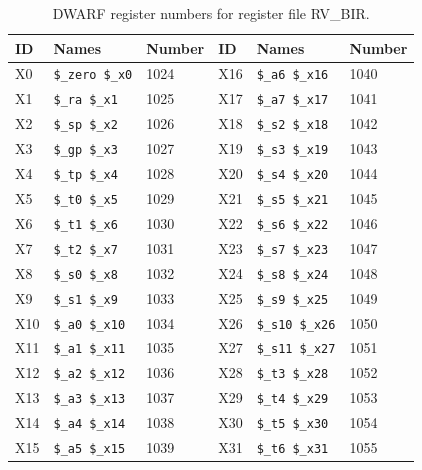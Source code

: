 \begin{table}
\begin{center}
{\small
\begin{tabular}{|l|l|l||l|l|l|} \hline
ID & Names & Number & ID & Names & Number \\ \hline
X0 & \verb|$_zero $_x0| & 1024 &
X16 & \verb|$_a6 $_x16| & 1040 \\
X1 & \verb|$_ra $_x1| & 1025 &
X17 & \verb|$_a7 $_x17| & 1041 \\
X2 & \verb|$_sp $_x2| & 1026 &
X18 & \verb|$_s2 $_x18| & 1042 \\
X3 & \verb|$_gp $_x3| & 1027 &
X19 & \verb|$_s3 $_x19| & 1043 \\
X4 & \verb|$_tp $_x4| & 1028 &
X20 & \verb|$_s4 $_x20| & 1044 \\
X5 & \verb|$_t0 $_x5| & 1029 &
X21 & \verb|$_s5 $_x21| & 1045 \\
X6 & \verb|$_t1 $_x6| & 1030 &
X22 & \verb|$_s6 $_x22| & 1046 \\
X7 & \verb|$_t2 $_x7| & 1031 &
X23 & \verb|$_s7 $_x23| & 1047 \\
X8 & \verb|$_s0 $_x8| & 1032 &
X24 & \verb|$_s8 $_x24| & 1048 \\
X9 & \verb|$_s1 $_x9| & 1033 &
X25 & \verb|$_s9 $_x25| & 1049 \\
X10 & \verb|$_a0 $_x10| & 1034 &
X26 & \verb|$_s10 $_x26| & 1050 \\
X11 & \verb|$_a1 $_x11| & 1035 &
X27 & \verb|$_s11 $_x27| & 1051 \\
X12 & \verb|$_a2 $_x12| & 1036 &
X28 & \verb|$_t3 $_x28| & 1052 \\
X13 & \verb|$_a3 $_x13| & 1037 &
X29 & \verb|$_t4 $_x29| & 1053 \\
X14 & \verb|$_a4 $_x14| & 1038 &
X30 & \verb|$_t5 $_x30| & 1054 \\
X15 & \verb|$_a5 $_x15| & 1039 &
X31 & \verb|$_t6 $_x31| & 1055 \\
\hline \end{tabular}
}
\end{center}
\caption{DWARF register numbers for register file RV_BIR.}
\label{table:DwarfId-RV_BIR}
\end{table}

